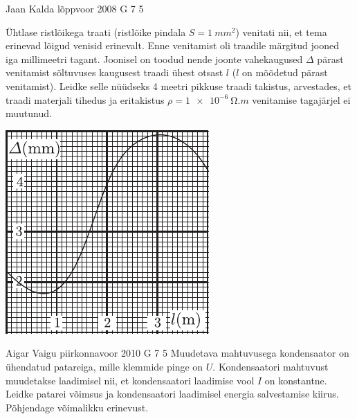 \documentclass[11pt]{article}
\begin{document}
{%
{Jaan Kalda} %
{lõppvoor} %
{2008} %
{G 7} %
{5} %
{
\ifStatement
Ühtlase ristlõikega traati (ristlõike pindala $S = \SI{1}{mm^2}$) venitati nii, et tema erinevad lõigud venisid erinevalt. Enne venitamist oli traadile märgitud jooned iga millimeetri tagant. Joonisel on toodud nende joonte vahekaugused $\Delta$ pärast venitamist sõltuvuses kaugusest traadi ühest otsast $l$ ($l$ on mõõdetud pärast venitamist). Leidke selle nüüdseks 4 meetri pikkuse traadi takistus, arvestades, et traadi materjali tihedus ja eritakistus $\rho = \SI{1e-6}{\ohm.m}$ venitamise tagajärjel ei muutunud.

\begin{center}
	\includegraphics[width=0.6\linewidth]{2008-v3g-07-yl}
\end{center}
\fi
}

{Aigar Vaigu} %
{piirkonnavoor} %
{2010} %
{G 7} %
{5} %
{
\ifStatement
Muudetava mahtuvusega kondensaator on ühendatud patareiga,
mille klemmide pinge on $U$. Kondensaatori mahtuvust muudetakse laadimisel nii, et
kondensaatori laadimise vool $I$ on konstantne. Leidke patarei võimsus ja kondensaatori laadimisel energia salvestamise kiirus.
Põhjendage võimalikku erinevust.
\fi
}
\newpage


}
\end{document}
